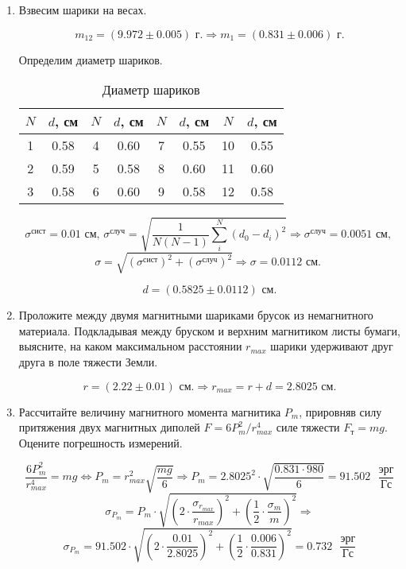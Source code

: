 \documentclass[a4paper,12pt]{article} %
\begin{document}
\begin{enumerate}
    \item Взвесим шарики на весах.

    \[ m_{12} = (9.972 \pm 0.005) \text{ г.} \Longrightarrow m_{1} = (0.831 \pm 0.006) \text{ г.} \]
    
    Определим диаметр шариков.

    \begin{table}[h]
    \centering
        \begin{tabular}{|c|c|c|c|c|c|c|c|}
            \hline
            $N$ & $d$, см & $N$ & $d$, см & $N$ & $d$, см & $N$ & $d$, см \\ \hline
              1 & 0.58 & 4 & 0.60 & 7 & 0.55 & 10 & 0.55 \\ \hline
              2 & 0.59 & 5 & 0.58 & 8 & 0.60 & 11 & 0.60 \\ \hline
              3 & 0.58 & 6 & 0.60 & 9 & 0.58 & 12 & 0.58 \\ \hline
        \end{tabular}
        \label{tab1}
        \caption{Диаметр шариков}
    \end{table}

    \[ \sigma^{\text{сист}} = 0.01 \text{ см, } \sigma^{\text{случ}} = \sqrt{\frac{1}{N(N-1)}\sum_{i}^{N}(d_0 - d_{i})^2} \Longrightarrow \sigma^{\text{случ}} = 0.0051 \text{ см, } \]
    \[ \sigma = \sqrt{(\sigma^{\text{сист}})^2 + (\sigma^{\text{случ}})^2} \Longrightarrow \sigma = 0.0112 \text{ см. } \]

    \[ d = (0.5825 \pm 0.0112) \text{ см.} \]

    \item Проложите между двумя магнитными шариками брусок из немагнитного материала. Подкладывая между бруском и верхним магнитиком листы бумаги, выясните, на каком максимальном расстоянии $r_{max}$ шарики удерживают друг друга в поле тяжести Земли. 

    \[ r = (2.22 \pm 0.01) \text{ см.} \Longrightarrow r_{max} = r + d = 2.8025 \text{ см.} \]

    \item Рассчитайте величину магнитного момента магнитика $P_m$, прировняв силу притяжения двух магнитных диполей $F = 6P_m^2/r_{max}^4$ силе тяжести $F_{\text{т}} = mg$. Оцените погрешность измерений.

    \[ \frac{6P_m^2}{r_{max}^4} = mg \Longleftrightarrow P_{m} = r_{max}^2\sqrt{\frac{mg}{6}} \Longrightarrow P_m = 2.8025^2\cdot\sqrt{\frac{0.831\cdot980}{6}} = 91.502 \text{ }\frac{\text{эрг}}{\text{Гс}} \]
    \[ \sigma_{P_m} = P_m\cdot\sqrt{\left(2\cdot\frac{\sigma_{r_{max}}}{r_{max}}\right)^2 + \left(\frac{1}{2}\cdot\frac{\sigma_m}{m}\right)^2} \Longrightarrow \] 
    \[ \sigma_{P_m} = 91.502\cdot\sqrt{\left(2\cdot\frac{0.01}{2.8025}\right)^2 + \left(\frac{1}{2}\cdot\frac{0.006}{0.831}\right)^2} = 0.732 \text{ }\frac{\text{эрг}}{\text{Гс}} \]


\end{enumerate}
\end{document}
